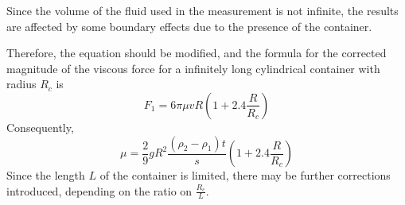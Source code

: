 Since the volume of the fluid used in the measurement is not infinite, the
results are affected by some boundary effects due to the presence of the
container.

Therefore, the equation should be modified, and the formula for the
corrected magnitude of the viscous force for a infinitely long cylindrical
container with radius $R_c$ is 
$$  F_1 = 6 \pi \mu v R (1 + 2.4 \frac{R}{R_c})  $$
Consequently,
$$ \mu = \frac{2}{9} g R^2 \frac{( \rho_2 - \rho_1 ) t  }{s} (1 + 2.4
\frac{R}{R_c})  $$
Since the length $L$ of the container is limited, there may be further
corrections introduced, depending on the ratio on $\frac{R_c}{L}$. 





